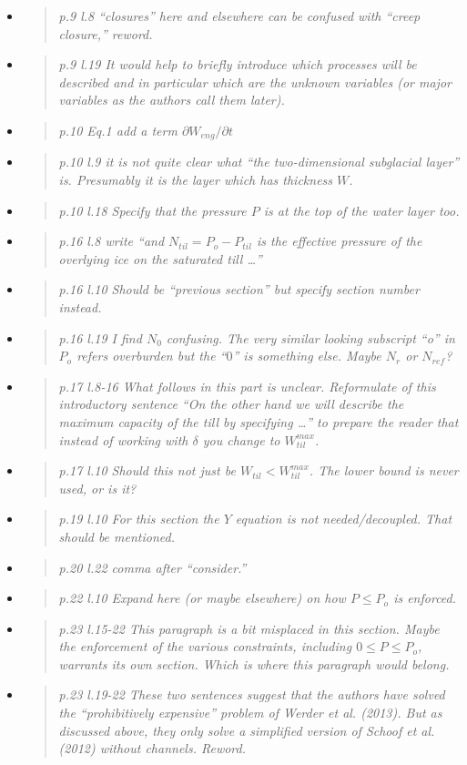 \documentclass[11pt,reqno]{amsart}
\newcommand{\reply}[2]{
\medskip\medskip
\item  \begin{quote}
\emph{#1}
\end{quote}

\medskip
\noindent #2}
\begin{document}
\begin{itemize}
\reply{p.9 l.8 ``closures'' here and elsewhere can be confused with ``creep closure,'' reword.}
{}

\reply{p.9 l.19 It would help to briefly introduce which processes will be described and in
particular which are the unknown variables (or major variables as the authors call
them later).}
{}

\reply{p.10 Eq.1 add a term $\partial W_{eng}/\partial t$}
{}

\reply{p.10 l.9 it is not quite clear what ``the two-dimensional subglacial layer'' is. Presumably
it is the layer which has thickness $W$.}
{}

\reply{p.10 l.18 Specify that the pressure $P$ is at the top of the water layer too.}
{}

\reply{p.16 l.8 write ``and $N_{til} = P_o-P_{til}$ is the effective pressure of the overlying ice on the saturated till \dots''}
{}

\reply{p.16 l.10 Should be ``previous section'' but specify section number instead.}
{}

\reply{p.16 l.19 I find $N_0$ confusing. The very similar looking subscript ``o'' in $P_o$ refers overburden but the ``$0$'' is something else. Maybe $N_r$ or $N_{ref}$?}
{}

\reply{p.17 l.8-16 What follows in this part is unclear. Reformulate of this introductory sentence ``On the other hand we will describe the maximum capacity of the till by specifying \dots'' to prepare the reader that instead of working with $\delta$ you change to $W_{til}^{max}$.}
{}

\reply{p.17 l.10 Should this not just be $W_{til} < W_{til}^{max}$.  The lower bound is never used, or is it?}
{}

\reply{p.19 l.10 For this section the $Y$ equation is not needed/decoupled. That should be
mentioned.}
{}

\reply{p.20 l.22 comma after ``consider.''}
{}

\reply{p.22 l.10 Expand here (or maybe elsewhere) on how $P \le P_o$ is enforced.}
{}

\reply{p.23 l.15-22 This paragraph is a bit misplaced in this section.  Maybe the enforcement
of the various constraints, including $0 \le P \le P_o$, warrants its own section.  Which
is where this paragraph would belong.}
{}

\reply{p.23 l.19-22 These two sentences suggest that the authors have solved the ``prohibitively expensive'' problem of Werder et al. (2013).  But as discussed above, they only solve a simplified version of Schoof et al. (2012) without channels.  Reword.}
{}


\end{itemize}
\end{document}
